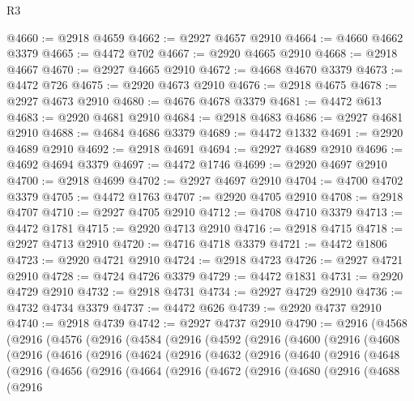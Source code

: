 \begin{lexlean}{R3}
\begin{coremodule}
@4660 := @2918 @4659
@4662 := @2927 @4657 @2910
@4664 := @4660 @4662 @3379
@4665 := @4472 @702
@4667 := @2920 @4665 @2910
@4668 := @2918 @4667
@4670 := @2927 @4665 @2910
@4672 := @4668 @4670 @3379
@4673 := @4472 @726
@4675 := @2920 @4673 @2910
@4676 := @2918 @4675
@4678 := @2927 @4673 @2910
@4680 := @4676 @4678 @3379
@4681 := @4472 @613
@4683 := @2920 @4681 @2910
@4684 := @2918 @4683
@4686 := @2927 @4681 @2910
@4688 := @4684 @4686 @3379
@4689 := @4472 @1332
@4691 := @2920 @4689 @2910
@4692 := @2918 @4691
@4694 := @2927 @4689 @2910
@4696 := @4692 @4694 @3379
@4697 := @4472 @1746
@4699 := @2920 @4697 @2910
@4700 := @2918 @4699
@4702 := @2927 @4697 @2910
@4704 := @4700 @4702 @3379
@4705 := @4472 @1763
@4707 := @2920 @4705 @2910
@4708 := @2918 @4707
@4710 := @2927 @4705 @2910
@4712 := @4708 @4710 @3379
@4713 := @4472 @1781
@4715 := @2920 @4713 @2910
@4716 := @2918 @4715
@4718 := @2927 @4713 @2910
@4720 := @4716 @4718 @3379
@4721 := @4472 @1806
@4723 := @2920 @4721 @2910
@4724 := @2918 @4723
@4726 := @2927 @4721 @2910
@4728 := @4724 @4726 @3379
@4729 := @4472 @1831
@4731 := @2920 @4729 @2910
@4732 := @2918 @4731
@4734 := @2927 @4729 @2910
@4736 := @4732 @4734 @3379
@4737 := @4472 @626
@4739 := @2920 @4737 @2910
@4740 := @2918 @4739
@4742 := @2927 @4737 @2910
@4790 := @2916
    (@4568
      (@2916
        (@4576
          (@2916
            (@4584
              (@2916
                (@4592
                  (@2916
                    (@4600
                      (@2916
                        (@4608
                          (@2916
                            (@4616
                              (@2916
                                (@4624
                                  (@2916
                                    (@4632
                                      (@2916
                                        (@4640
                                          (@2916
                                            (@4648
                                              (@2916
                                                (@4656
                                                  (@2916
                                                    (@4664
                                                      (@2916
                                                        (@4672
                                                          (@2916
                                                            (@4680
                                                              (@2916
                                                                (@4688
                                                                  (@2916

\end{coremodule}
\end{lexlean}
